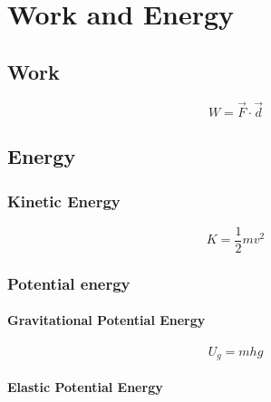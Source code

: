 \chapter{Work and Energy}
	\section{Work}
	
		\begin{mdframed}[backgroundcolor=orange!20!white]
		\begin{equation}
		W = \vec{F}\cdot\vec{d}  
		\label{eqn:work}
		\end{equation}
	\end{mdframed}
	
	\section{Energy}
	\subsection{Kinetic Energy}  \label{Kinetic Energy}
		\begin{mdframed}[backgroundcolor=orange!20!white]
		\begin{equation}
		K = \frac{1}{2}mv^2 
		\label{eqn:kineticenergy}
		\end{equation}
	\end{mdframed}
	
	\subsection{Potential energy}
	\subsubsection{Gravitational Potential Energy}  
	
			\begin{mdframed}[backgroundcolor=orange!20!white]
		\begin{equation}
		U_g = mhg
		\label{eqn:gravitationalpotentialenergy}
		\end{equation}
	\end{mdframed}
	
	\subsubsection{Elastic Potential Energy}  
	
